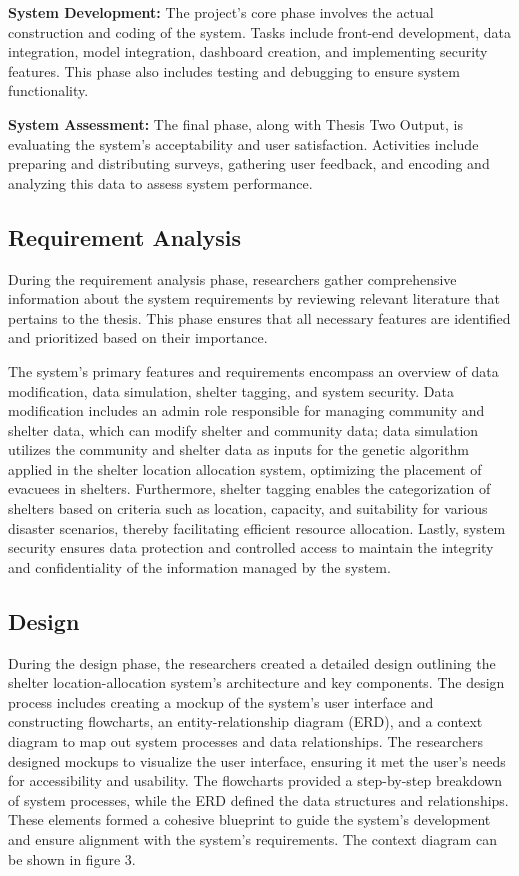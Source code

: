\textbf{System Development:} The project's core phase involves the actual construction and coding of the system. Tasks include front-end development, data integration, model integration, dashboard creation, and implementing security features. This phase also includes testing and debugging to ensure system functionality.

\textbf{System Assessment:} The final phase, along with Thesis Two Output, is evaluating the system's acceptability and user satisfaction. Activities include preparing and distributing surveys, gathering user feedback, and encoding and analyzing this data to assess system performance.

\subsection{Requirement Analysis}

During the requirement analysis phase, researchers gather comprehensive information about the system requirements by reviewing relevant literature that pertains to the thesis. This phase ensures that all necessary features are identified and prioritized based on their importance.

The system's primary features and requirements encompass an overview of data modification, data simulation, shelter tagging, and system security. Data modification includes an admin role responsible for managing community and shelter data, which can modify shelter and community data; data simulation utilizes the community and shelter data as inputs for the genetic algorithm applied in the shelter location allocation system, optimizing the placement of evacuees in shelters. Furthermore, shelter tagging enables the categorization of shelters based on criteria such as location, capacity, and suitability for various disaster scenarios, thereby facilitating efficient resource allocation. Lastly, system security ensures data protection and controlled access to maintain the integrity and confidentiality of the information managed by the system.

\subsection{Design}

During the design phase, the researchers created a detailed design outlining the shelter location-allocation system's architecture and key components. The design process includes creating a mockup of the system's user interface and constructing flowcharts, an entity-relationship diagram (ERD), and a context diagram to map out system processes and data relationships. The researchers designed mockups to visualize the user interface, ensuring it met the user's needs for accessibility and usability. The flowcharts provided a step-by-step breakdown of system processes, while the ERD defined the data structures and relationships. These elements formed a cohesive blueprint to guide the system's development and ensure alignment with the system's requirements. The context diagram can be shown in figure 3.

